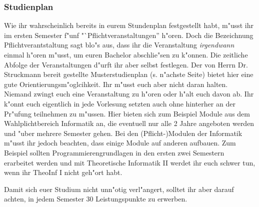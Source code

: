 \subsubsection{Studienplan}

Wie ihr wahrscheinlich bereits in eurem Stundenplan festgestellt habt, m"usst ihr im ersten Semester f"unf "`Pflichtveranstaltungen'' h"oren.
Doch die Bezeichnung Pflichtverantstaltung sagt blo"s aus, dass ihr die Veranstaltung \emph{irgendwann} einmal h"oren m"usst, um euren Bachelor abschlie"sen zu k"onnen.
Die zeitliche Abfolge der Veranstaltungen d"urft ihr aber selbst festlegen.
Der von Herrn Dr. Struckmann bereit gestellte Musterstudienplan (s. n"achste Seite) bietet hier eine gute Orientierungsm"oglcihkeit.
Ihr m"usst euch aber nicht daran halten. Niemand zwingt euch eine Veranstaltung zu h"oren oder h"alt euch davon ab.
Ihr k"onnt euch eigentlich in jede Vorlesung setzten auch ohne hinterher an der Pr"ufung teilnehmen zu m"ussen.
Hier bieten sich zum Beispiel Module aus dem Wahlplichtbereich Informatik an, die eventuell nur alle 2 Jahre angeboten werden und "uber mehrere Semester gehen.
Bei den (Pflicht-)Modulen der Informatik m"usst ihr jedoch beachten, dass einige Module auf anderen aufbauen.
Zum Beispiel sollten Programmierengrundlagen in den ersten zwei Semestern erarbeitet werden und mit Theoretische Informatik II werdet ihr euch schwer tun, wenn ihr TheoInf I nicht geh"ort habt.

Damit sich euer Studium nicht unn"otig verl"angert, solltet ihr aber darauf achten, in jedem Semester 30 Leistungspunkte zu erwerben. 

